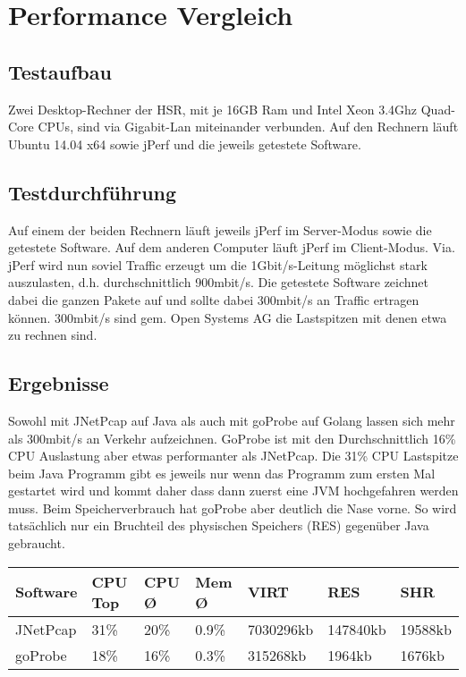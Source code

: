 \section{Performance Vergleich}
\label{sec:Performance Vergleich}

\subsection{Testaufbau}
Zwei Desktop-Rechner der HSR, mit je 16GB Ram und Intel Xeon 3.4Ghz Quad-Core CPUs, sind via Gigabit-Lan miteinander verbunden. Auf den Rechnern läuft Ubuntu 14.04 x64 sowie jPerf und die jeweils getestete Software.


\subsection{Testdurchführung}
Auf einem der beiden Rechnern läuft jeweils jPerf im Server-Modus sowie die getestete Software. Auf dem anderen Computer läuft jPerf im Client-Modus.
Via. jPerf wird nun soviel Traffic erzeugt um die 1Gbit/s-Leitung möglichst stark auszulasten, d.h. durchschnittlich 900mbit/s. Die getestete Software zeichnet dabei die ganzen Pakete auf und sollte dabei 300mbit/s an Traffic ertragen können. 300mbit/s sind gem. Open Systems AG die Lastspitzen mit denen etwa zu rechnen sind.

\subsection{Ergebnisse}
Sowohl mit JNetPcap auf Java als auch mit goProbe auf Golang lassen sich mehr als 300mbit/s an Verkehr aufzeichnen. GoProbe ist mit den Durchschnittlich 16\% CPU Auslastung aber etwas performanter als JNetPcap. Die 31\% CPU Lastspitze beim Java Programm gibt es jeweils nur wenn das Programm zum ersten Mal gestartet wird und kommt daher dass dann zuerst eine \acs{JVM} hochgefahren werden muss.
Beim Speicherverbrauch hat goProbe aber deutlich die Nase vorne. So wird tatsächlich nur ein Bruchteil des physischen Speichers (RES) gegenüber Java gebraucht.


\begin{table}[h]
\begin{tabular}{|l|l|l|l|l|l|l|}
\hline
\rowcolor[HTML]{C0C0C0} 
\textbf{Software} & \textbf{CPU Top} & \textbf{CPU Ø} & \textbf{Mem Ø} & \textbf{VIRT\footnotemark[1]} & \textbf{RES\footnotemark[2]} & \textbf{SHR\footnotemark[3]} \\ \hline
JNetPcap          & 31\%             & 20\%           & 0.9\%          & 7030296kb       & 147840kb       & 19588kb        \\ \hline
goProbe           & 18\%             & 16\%           & 0.3\%          & 315268kb        & 1964kb         & 1676kb         \\ \hline
\end{tabular}
\end{table}

